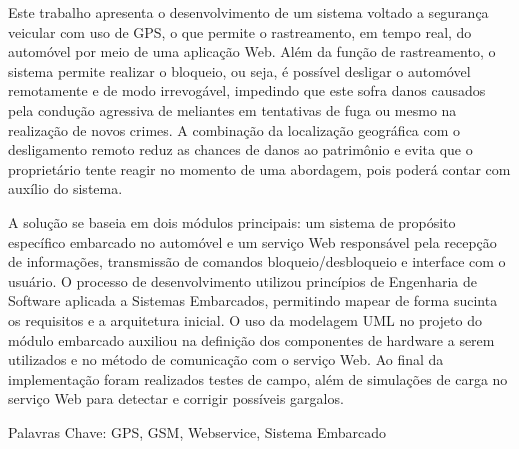 
Este trabalho apresenta o desenvolvimento de um sistema voltado a segurança veicular com uso de GPS, o que permite o rastreamento, em tempo real, do automóvel por meio de uma aplicação Web. Além da função de rastreamento, o sistema permite realizar o bloqueio, ou seja, é possível desligar o automóvel remotamente e de modo irrevogável, impedindo que este sofra danos causados pela condução agressiva de meliantes em tentativas de fuga ou mesmo na realização de novos crimes. A combinação da localização geográfica com o desligamento remoto reduz as chances de danos ao patrimônio e evita que o proprietário tente reagir no momento de uma abordagem, pois poderá contar com auxílio do sistema.

A solução se baseia em dois módulos principais: um sistema de propósito específico embarcado no automóvel e um serviço Web responsável pela recepção de informações, transmissão de comandos bloqueio/desbloqueio e interface com o usuário. O processo de desenvolvimento utilizou princípios de Engenharia de Software aplicada a Sistemas Embarcados, permitindo mapear de forma sucinta os requisitos e a arquitetura inicial. O uso da modelagem UML no projeto do módulo embarcado auxiliou na definição dos componentes de hardware a serem utilizados e no método de comunicação com o serviço Web. Ao final da implementação foram realizados testes de campo, além de simulações de carga no serviço Web para detectar e corrigir possíveis gargalos. 


Palavras Chave: GPS, GSM, Webservice, Sistema Embarcado
